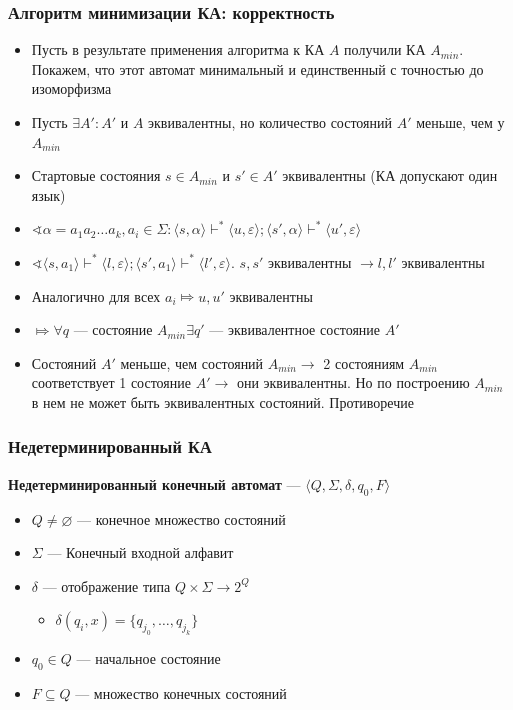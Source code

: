 \documentclass{beamer}
\begin{document}
\begin{frame}[fragile]
  \transwipe[direction=90]
  \frametitle{Алгоритм минимизации КА: корректность}
    \begin{itemize}
      \item Пусть в результате применения алгоритма к КА $A$ получили КА $A_{min}$. Покажем, что этот автомат минимальный и единственный с точностью до изоморфизма
      \item Пусть $\exists A' : A'$ и $A$ эквивалентны, но количество состояний $A'$ меньше, чем у $A_{min}$
      \item Стартовые состояния $s \in A_{min}$ и $s' \in A'$ эквивалентны (КА допускают один язык)
      \item $\sphericalangle \alpha = a_1 a_2 \dots a_k, a_i \in \Sigma: \langle s, \alpha \rangle \vdash^* \langle u, \varepsilon \rangle; \langle s', \alpha \rangle \vdash^* \langle u', \varepsilon \rangle$
      \item $\sphericalangle \langle s, a_1 \rangle \vdash^* \langle l, \varepsilon \rangle; \langle s', a_1 \rangle \vdash^* \langle l', \varepsilon \rangle$. $s, s'$ эквивалентны $\to l, l'$ эквивалентны
      \item Аналогично для всех $a_i \Mapsto u, u'$ эквивалентны
      \item $\Mapsto \forall q$ --- состояние $A_{min} \exists q'$ --- эквивалентное состояние $A'$
      \item Состояний $A'$ меньше, чем состояний $A_{min} \to$ 2 состояниям $A_{min}$ соответствует 1 состояние $A' \to$ они эквивалентны. Но по построению $A_{min}$ в нем не может быть эквивалентных состояний. Противоречие
    \end{itemize}

\end{frame}


\begin{frame}[fragile]
  \transwipe[direction=90]
  \frametitle{Недетерминированный КА}
 \textbf{Недетерминированный конечный автомат} --- $\langle Q, \Sigma, \delta, q_0, F \rangle$
  \begin{itemize}
    \item $Q \neq \varnothing$ --- конечное множество состояний
    \item $\Sigma$ --- Конечный входной алфавит
    \item $\delta$ --- отображение типа $Q \times \Sigma \rightarrow 2^Q$
    \begin{itemize}
      \item $\delta(q_i, x) = \{ q_{j_0}, \dots, q_{j_k} \}$
    \end{itemize}
    \item $q_0 \in Q$ --- начальное состояние
    \item $F \subseteq Q$ --- множество конечных состояний
  \end{itemize}

\end{frame}
\end{document}
